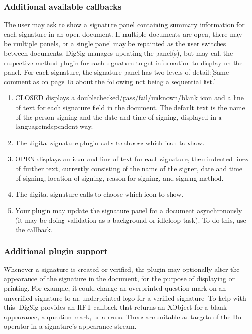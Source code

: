 \documentclass[letterpaper,12pt,english,openany,oneside]{sphinxmanual}
\begin{document}
\subsubsection{Additional available callbacks}
\label{\detokenize{Plugins_ExtendedAPI:additional-available-callbacks}}
The user may ask to show a signature panel containing summary information for each signature in an open document. If multiple documents are open, there may be multiple panels, or a single panel may be repainted as the user switches between documents. DigSig manages updating the panel(s), but may call the respective method plugin for each signature to get information to display on the panel. For each signature, the signature panel has two levels of detail:{[}Same comment as on page 15 about the following not being a sequential list.{]}
\begin{enumerate}
%
\item {} 
CLOSED displays a doublechecked/pass/fail/unknown/blank icon and a line of text for each signature field in the document. The default text is the name of the person signing and the date and time of signing, displayed in a language\sphinxhyphen{}independent way.

\item {} 
The digital signature plugin calls  to choose which icon to show.

\item {} 
OPEN displays an icon and line of text for each signature, then indented lines of further text, currently consisting of the name of the signer, date and time of signing, location of signing, reason for signing, and signing method.

\item {} 
The digital signature calls  to choose which icon to show.

\item {} 
Your plugin may update the signature panel for a document asynchronously (it may be doing validation as a background or idle\sphinxhyphen{}loop task). To do this, use the  callback.

\end{enumerate}


\subsubsection{Additional plugin support}
\label{\detokenize{Plugins_ExtendedAPI:additional-plugin-support}}
Whenever a signature is created or verified, the plugin may optionally alter the appearance of the signature in the document, for the purpose of displaying or printing. For example, it could change an overprinted question mark on an unverified signature to an underprinted logo for a verified signature. To help with this, DigSig provides an HFT callback  that returns an XObject for a blank appearance, a question mark, or a cross. These are suitable as targets of the Do operator in a signature’s appearance stream.
\end{document}
